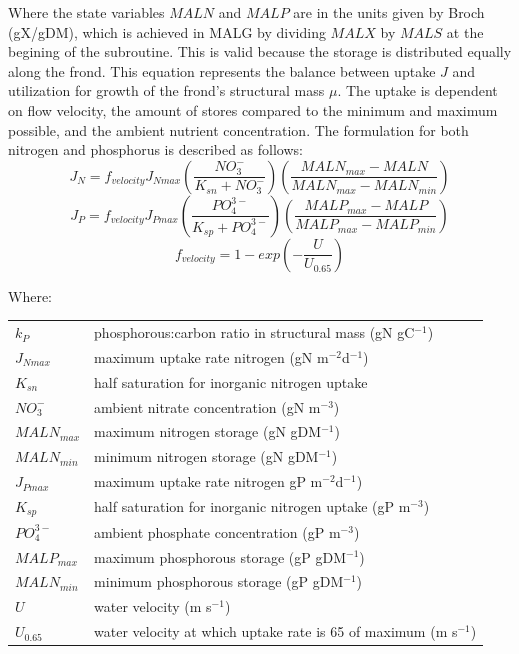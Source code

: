 \documentclass{deltares_manual}
\begin{document}
Where the state variables $MALN$ and $MALP$ are in the units given by Broch (gX/gDM), which is achieved in MALG by dividing $MALX$ by $MALS$ at the begining of the subroutine. This is valid because the storage is distributed equally along the frond. This equation represents the balance between uptake $J$ and utilization for growth of the frond's structural mass $\mu$. The uptake is dependent on flow velocity, the amount of stores compared to the minimum and maximum possible, and the ambient nutrient concentration. The formulation for both nitrogen and phosphorus is described as follows:
\begin{equation}
J_N = f_{velocity}J_{Nmax}(\frac{NO_3^-}{K_{sn}+NO_3^-})(\frac{MALN_{max}-MALN}{MALN_{max}-MALN_{min}})
\end{equation}
\begin{equation}
J_P = f_{velocity}J_{Pmax}(\frac{PO_4^{3-}}{K_{sp}+PO_4^{3-}})(\frac{MALP_{max}-MALP}{MALP_{max}-MALP_{min}})
\end{equation}
\begin{equation}
f_{velocity} = 1-exp(-\frac{U}{U_{0.65}})
\end{equation}

Where:\\

\begin{tabular}{ll}
$k_P$        & phosphorous:carbon ratio in structural mass (gN gC$^{-1}$)\\
$J_{Nmax}$   & maximum uptake rate nitrogen (gN m$^{-2}$d$^{-1}$)\\
$K_{sn}$     & half saturation for inorganic nitrogen uptake\\
$NO_3^-$     & ambient nitrate concentration (gN m$^{-3}$)\\
$MALN_{max}$ & maximum nitrogen storage (gN gDM$^{-1}$)\\
$MALN_{min}$ & minimum nitrogen storage (gN gDM$^{-1}$)\\
$J_{Pmax}$   & maximum uptake rate nitrogen gP m$^{-2}$d$^{-1}$)\\
$K_{sp}$     & half saturation for inorganic nitrogen uptake (gP m$^{-3}$)\\
$PO_4^{3-}$  & ambient phosphate concentration (gP m$^{-3}$)\\
$MALP_{max}$ & maximum phosphorous storage (gP gDM$^{-1}$)\\
$MALN_{min}$ & minimum phosphorous storage (gP gDM$^{-1}$)\\
$U$          & water velocity (m s$^{-1}$)\\
$U_{0.65}$   & water velocity at which uptake rate is 65 of maximum (m s$^{-1}$)\\
\end{tabular}
\end{document}
